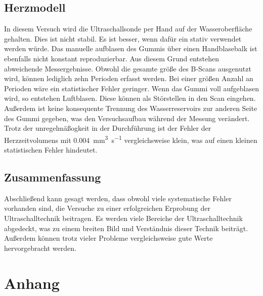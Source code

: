 \subsection{Herzmodell}
In diesem Versuch wird die Ultraschallsonde per Hand auf der Wasseroberfläche gehalten. Dies ist nicht stabil. 
Es ist besser, wenn dafür ein stativ verwendet werden würde. Das manuelle aufblasen des Gummis über einen 
Handblasebalk ist ebenfalls nicht konstant reproduzierbar. Aus diesem Grund entstehen abweichende Messergebnisse. 
Obwohl die gesamte größe des B-Scans ausgenutzt wird, können lediglich zehn Perioden erfasst werden. Bei einer 
größen Anzahl an Perioden wäre ein statistischer Fehler geringer. Wenn das Gummi voll aufgeblasen wird, so 
entstehen Luftblasen. Diese können als Störstellen in den Scan eingehen. Außerdem ist keine konsequente Trennung 
des Wasserreservoirs zur anderen Seite des Gummi gegeben, was den Versuchsaufbau während der Messung verändert. 
Trotz der unregelmäßogkeit in der Durchführung ist der Fehler der Herzzeitvolumens mit 
\qty{0.004}{\cubic\milli\meter\per\second} vergleichsweise klein, was auf einen kleinen statistischen Fehler 
hindeutet.


\subsection{Zusammenfassung}
Abschließend kann gesagt werden, dass obwohl viele systematische Fehler vorhanden sind, die Versuche zu einer 
erfolgreichen Erprobung der Ultraschalltechnik beitragen. Es werden viele Bereiche der Ultraschalltechnik 
abgedeckt, was zu einem breiten Bild und Verständnis dieser Technik beiträgt. Außerdem können trotz vieler 
Probleme vergleichsweise gute Werte hervorgebracht werden.   

\section{Anhang}

